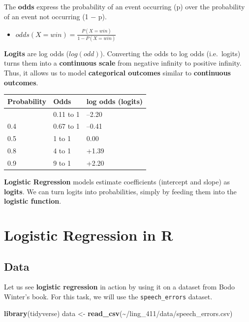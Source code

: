 \documentclass[
]{book}
\newenvironment{Shaded}{\begin{snugshade}}{\end{snugshade}}
\newcommand{\FunctionTok}[1]{\textcolor[rgb]{0.13,0.29,0.53}{\textbf{#1}}}
\newcommand{\NormalTok}[1]{#1}
\newcommand{\OtherTok}[1]{\textcolor[rgb]{0.56,0.35,0.01}{#1}}
\newcommand{\StringTok}[1]{\textcolor[rgb]{0.31,0.60,0.02}{#1}}
\providecommand{\tightlist}{%
  \setlength{\itemsep}{0pt}\setlength{\parskip}{0pt}}
\begin{document}
The \textbf{odds} express the probability of an event occurring (p) over the probability of an event not occurring (1 − p).

\begin{itemize}
\tightlist
\item
  \(odds(X=win) = \frac{P(X=win)}{1-P(X=win)}\)
\end{itemize}

\textbf{Logits} are log odds (\(log(odd)\)). Converting the odds to log odds (i.e.~logits) turns them into a \textbf{continuous scale} from negative infinity to positive infinity. Thus, it allows us to model \textbf{categorical outcomes} similar to \textbf{continuous outcomes}.

\begin{longtable}[]{@{}lll@{}}
\toprule\noalign{}
\textbf{Probability} & \textbf{Odds} & \textbf{log odds (logits}) \\
\midrule\noalign{}
\endhead
\bottomrule\noalign{}
\endlastfoot
0.1 & 0.11 to 1 & --2.20 \\
0.4 & 0.67 to 1 & --0.41 \\
0.5 & 1 to 1 & 0.00 \\
0.8 & 4 to 1 & +1.39 \\
0.9 & 9 to 1 & +2.20 \\
\end{longtable}

\textbf{Logistic Regression} models estimate coefficients (intercept and slope) as \textbf{logits}. We can turn logits into probabilities, simply by feeding them into the \textbf{logistic function}.

\section{Logistic Regression in R}\label{logistic-regression-in-r}

\subsection{Data}\label{data}

Let us see \textbf{logistic regression} in action by using it on a dataset from Bodo Winter's book. For this task, we will use the \texttt{speech\_errors} dataset.

\begin{Shaded}
\begin{Highlighting}[]
\FunctionTok{library}\NormalTok{(tidyverse)}
\NormalTok{data }\OtherTok{\textless{}{-}} \FunctionTok{read\_csv}\NormalTok{(}\StringTok{\textquotesingle{}\textasciitilde{}/ling\_411/data/speech\_errors.csv\textquotesingle{}}\NormalTok{)}
\end{Highlighting}
\end{Shaded}
\end{document}
